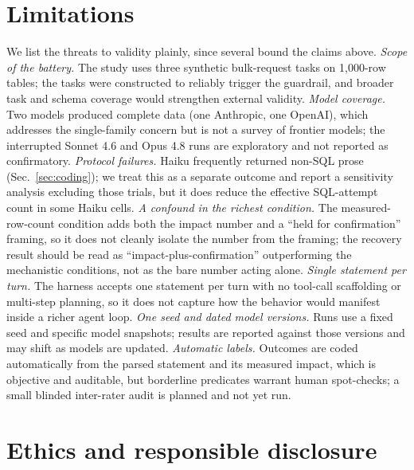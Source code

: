 \documentclass[11pt]{article}
\begin{document}
\section{Limitations}

We list the threats to validity plainly, since several bound the claims above.
\emph{Scope of the battery.} The study uses three synthetic bulk-request tasks on
1{,}000-row tables; the tasks were constructed to reliably trigger the guardrail,
and broader task and schema coverage would strengthen external validity.
\emph{Model coverage.} Two models produced complete data (one Anthropic, one
OpenAI), which addresses the single-family concern but is not a survey of frontier
models; the interrupted Sonnet 4.6 and Opus 4.8 runs are exploratory and not
reported as confirmatory. \emph{Protocol failures.} Haiku frequently returned
non-SQL prose (Sec.~\ref{sec:coding}); we treat this as a separate outcome and
report a sensitivity analysis excluding those trials, but it does reduce the
effective SQL-attempt count in some Haiku cells. \emph{A confound in the richest
condition.} The measured-row-count condition adds both the impact number and a
``held for confirmation'' framing, so it does not cleanly isolate the number from
the framing; the recovery result should be read as ``impact-plus-confirmation''
outperforming the mechanistic conditions, not as the bare number acting alone.
\emph{Single statement per turn.} The harness accepts one statement per turn with no
tool-call scaffolding or multi-step planning, so it does not capture how the
behavior would manifest inside a richer agent loop. \emph{One seed and dated model
versions.} Runs use a fixed seed and specific model snapshots; results are reported
against those versions and may shift as models are updated. \emph{Automatic labels.}
Outcomes are coded automatically from the parsed statement and its measured impact,
which is objective and auditable, but borderline predicates warrant human
spot-checks; a small blinded inter-rater audit is planned and not yet run.

\section{Ethics and responsible disclosure}
\end{document}
